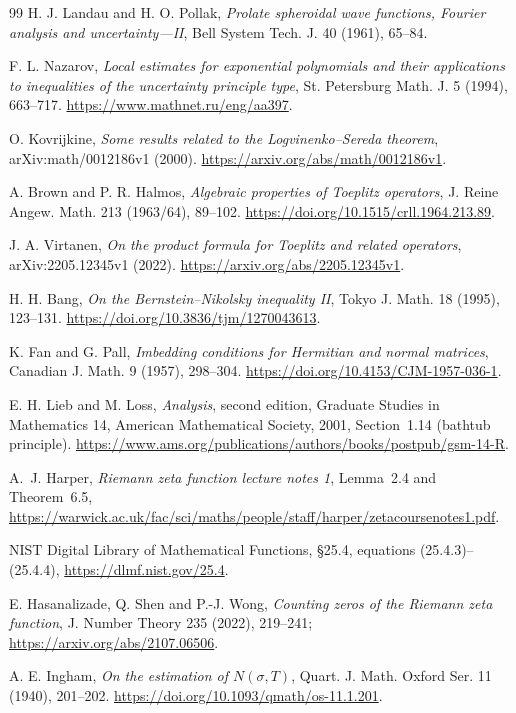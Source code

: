 \documentclass[11pt]{article}
\theoremstyle{remark}
\begin{document}
\begin{thebibliography}{99}
H. J. Landau and H. O. Pollak,
\emph{Prolate spheroidal wave functions, Fourier analysis and
uncertainty---II},
Bell System Tech. J. 40 (1961), 65--84.

F. L. Nazarov,
\emph{Local estimates for exponential polynomials and their
applications to inequalities of the uncertainty principle type},
St. Petersburg Math. J. 5 (1994), 663--717.
\url{https://www.mathnet.ru/eng/aa397}.

O. Kovrijkine,
\emph{Some results related to the Logvinenko--Sereda theorem},
arXiv:math/0012186v1 (2000).
\url{https://arxiv.org/abs/math/0012186v1}.

A. Brown and P. R. Halmos,
\emph{Algebraic properties of Toeplitz operators},
J. Reine Angew. Math. 213 (1963/64), 89--102.
\url{https://doi.org/10.1515/crll.1964.213.89}.

J. A. Virtanen,
\emph{On the product formula for Toeplitz and related operators},
arXiv:2205.12345v1 (2022).
\url{https://arxiv.org/abs/2205.12345v1}.

H. H. Bang,
\emph{On the Bernstein--Nikolsky inequality II},
Tokyo J. Math. 18 (1995), 123--131.
\url{https://doi.org/10.3836/tjm/1270043613}.


K. Fan and G. Pall, \emph{Imbedding conditions for Hermitian and normal
matrices}, Canadian J. Math. 9 (1957), 298--304.
\url{https://doi.org/10.4153/CJM-1957-036-1}.

E. H. Lieb and M. Loss, \emph{Analysis}, second edition,
Graduate Studies in Mathematics 14, American Mathematical Society, 2001,
Section~1.14 (bathtub principle).
\url{https://www.ams.org/publications/authors/books/postpub/gsm-14-R}.

A.~J. Harper, \emph{Riemann zeta function lecture notes 1},
Lemma~2.4 and Theorem~6.5,
\url{https://warwick.ac.uk/fac/sci/maths/people/staff/harper/zetacoursenotes1.pdf}.

NIST Digital Library of Mathematical Functions,
\S25.4, equations (25.4.3)--(25.4.4),
\url{https://dlmf.nist.gov/25.4}.

E. Hasanalizade, Q. Shen and P.-J. Wong,
\emph{Counting zeros of the Riemann zeta function},
J. Number Theory 235 (2022), 219--241;
\url{https://arxiv.org/abs/2107.06506}.

A. E. Ingham, \emph{On the estimation of $N(\sigma,T)$},
Quart. J. Math. Oxford Ser. 11 (1940), 201--202.
\url{https://doi.org/10.1093/qmath/os-11.1.201}.


\end{thebibliography}
\end{document}
